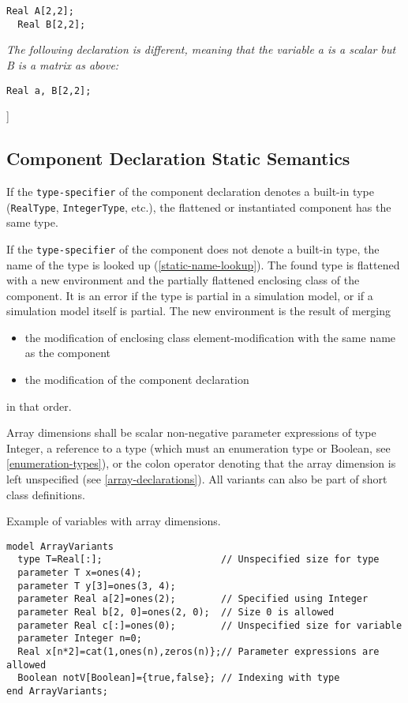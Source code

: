 \begin{lstlisting}[language=modelica]
  Real A[2,2];
  Real B[2,2];
\end{lstlisting}
\emph{The following declaration is different, meaning that the variable
a is a scalar but B is a matrix as above:}

\begin{lstlisting}[language=modelica]
  Real a, B[2,2];
\end{lstlisting}
{]}

\subsection{Component Declaration Static Semantics}

If the \lstinline!type-specifier! of the component declaration denotes a built-in
type (\lstinline!RealType!, \lstinline!IntegerType!, etc.), the flattened or instantiated
component has the same type.

If the \lstinline!type-specifier! of the component does not denote a built-in type,
the name of the type is looked up (\autoref{static-name-lookup}). The found type is
flattened with a new environment and the partially flattened enclosing
class of the component. It is an error if the type is partial in a
simulation model, or if a simulation model itself is partial. The new
environment is the result of merging

\begin{itemize}
\item
  the modification of enclosing class element-modification with the same
  name as the component
\item
  the modification of the component declaration
\end{itemize}
in that order.

Array dimensions shall be scalar non-negative parameter expressions of type Integer,
a reference to a type (which must an enumeration type or Boolean, see \autoref{enumeration-types}),
or the colon operator denoting that the array dimension is left unspecified (see \autoref{array-declarations}).
All variants can also be part of short class definitions.

\begin{nonnormative}
Example of variables with array dimensions.
\begin{lstlisting}[language=modelica]
model ArrayVariants
  type T=Real[:];                     // Unspecified size for type
  parameter T x=ones(4);
  parameter T y[3]=ones(3, 4);
  parameter Real a[2]=ones(2);        // Specified using Integer
  parameter Real b[2, 0]=ones(2, 0);  // Size 0 is allowed
  parameter Real c[:]=ones(0);        // Unspecified size for variable
  parameter Integer n=0;
  Real x[n*2]=cat(1,ones(n),zeros(n)};// Parameter expressions are allowed
  Boolean notV[Boolean]={true,false}; // Indexing with type
end ArrayVariants;
\end{lstlisting}
\end{nonnormative}

